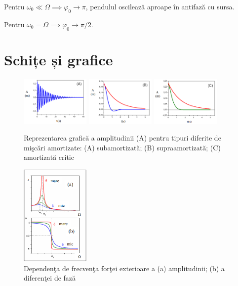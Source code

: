 \documentclass[a4paper]{article}
\renewcommand{\phi}{\varphi} %
\renewcommand{\Omega}{\varOmega} %
\begin{document}
Pentru $\omega_0 \ll \Omega \implies \phi_0 \to \pi$, pendulul
oscilează aproape în antifază cu sursa.

Pentru $\omega_0 = \Omega \implies \phi_0 \to \pi / 2$.

\section{Schițe și grafice}
\begin{figure}[htbp]
	\centering
	\includegraphics[width=0.3\textwidth]{subamortizata.png}
	\includegraphics[width=0.3\textwidth]{supraamortizata.png}
	\includegraphics[width=0.3\textwidth]{amortizata_critic.png}
	\caption{Reprezentarea grafică a
		amplitudinii (A) pentru tipuri
		diferite de mişcări amortizate: (A)
		subamortizată; (B) supraamortizată;
		(C) amortizată critic}
	\label{fig:grafice_amortizare}
\end{figure}

\begin{figure}[htbp]
	\centering
	\includegraphics[width=0.3\textwidth]{frecventa_amplitudine_faza.png}
	\caption{Dependenţa de
		frecvenţa forţei exterioare a
		(a) amplitudinii; (b) a
		diferenţei de fază}
	\label{fig:freampfaz}
\end{figure}
\end{document}
